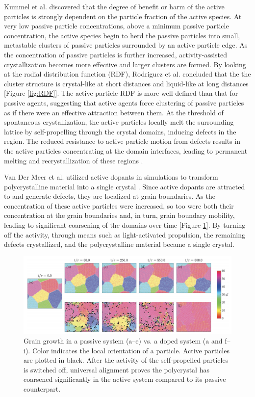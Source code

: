 \documentclass[11pt]{article}
\begin{document}
Kummel et al.\cite{Kummel} discovered that the degree of benefit or harm of the active particles is strongly dependent on the particle fraction of the active species.  At very low passive particle concentrations, above a minimum passive particle concentration, the active species begin to herd the passive particles into small, metastable clusters of passive particles surrounded by an active particle edge.  As the concentration of passive particles is further increased, activity-assisted crystallization becomes more effective and larger clusters are formed.  By looking at the radial distribution function (RDF), Rodriguez et al.\cite{Rodriguez} concluded that the the cluster structure is crystal-like at short distances and liquid-like at long distances [Figure \ref{fig:RDF}].  The active particle RDF is more well-defined than that for passive agents, suggesting that active agents force clustering of passive particles as if there were an effective attraction between them.  At the threshold of spontaneous crystallization, the active particles locally melt the surrounding lattice by self-propelling through the crystal domains, inducing defects in the region. The reduced resistance to active particle motion from defects results in the active particles concentrating at the domain interfaces, leading to permanent melting and recrystallization of these regions \cite{Kummel}.

Van Der Meer et al. \cite{Meer} utilized active dopants in simulations to transform polycrystalline material into a single crystal . Since active dopants are attracted to and generate defects, they are localized at grain boundaries.  As the concentration of these active particles were increased, so too were both their concentration at the grain boundaries and, in turn, grain boundary mobility, leading to significant coarsening of the domains over time [Figure \ref{fig:crystal}].  By turning off the activity, through means such as light-activated propulsion, the remaining defects crystallized, and the polycrystalline material became a single crystal.  

\begin{figure}[ht]
\centering\includegraphics[width=1.0\linewidth]{Screen Shot 2020-08-12 at 12.21.43 PM.png}
\caption{Grain growth in a passive system (a–e) vs. a doped system (a and f–i). Color indicates the local orientation of a particle. Active particles are plotted in black. After the activity of the self-propelled particles is switched off, universal alignment proves the polycrystal has coarsened significantly in the active system compared to its passive counterpart. \cite{Meer} }
\label{fig:crystal}
\end{figure}
\end{document}
